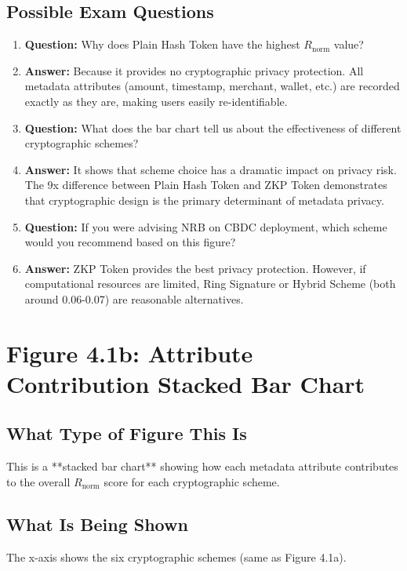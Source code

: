\documentclass[12pt,a4paper,oneside,openany]{report}
\begin{document}
\subsection{Possible Exam Questions}
\begin{enumerate}
    \item \textbf{Question:} Why does Plain Hash Token have the highest $R_{\mathrm{norm}}$ value?
    \item \textbf{Answer:} Because it provides no cryptographic privacy protection. All metadata attributes (amount, timestamp, merchant, wallet, etc.) are recorded exactly as they are, making users easily re-identifiable.

    \item \textbf{Question:} What does the bar chart tell us about the effectiveness of different cryptographic schemes?
    \item \textbf{Answer:} It shows that scheme choice has a dramatic impact on privacy risk. The 9x difference between Plain Hash Token and ZKP Token demonstrates that cryptographic design is the primary determinant of metadata privacy.

    \item \textbf{Question:} If you were advising NRB on CBDC deployment, which scheme would you recommend based on this figure?
    \item \textbf{Answer:} ZKP Token provides the best privacy protection. However, if computational resources are limited, Ring Signature or Hybrid Scheme (both around 0.06-0.07) are reasonable alternatives.
\end{enumerate}

\section{Figure 4.1b: Attribute Contribution Stacked Bar Chart}
\label{sec:f4.1b}

\subsection{What Type of Figure This Is}
This is a **stacked bar chart** showing how each metadata attribute contributes to the overall $R_{\mathrm{norm}}$ score for each cryptographic scheme.

\subsection{What Is Being Shown}
The x-axis shows the six cryptographic schemes (same as Figure 4.1a).
\end{document}
